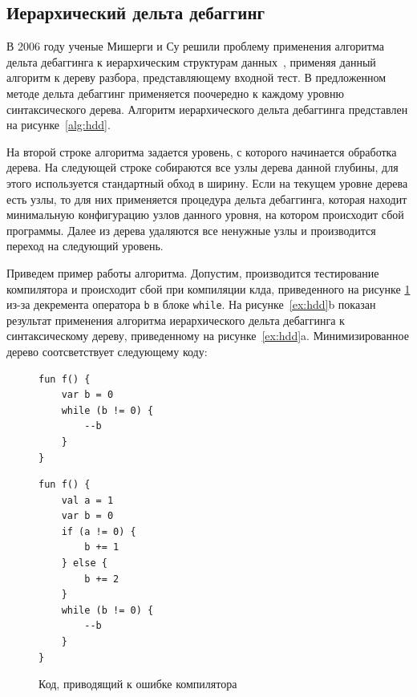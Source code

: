 \subsection{Иерархический дельта дебаггинг}
В 2006 году ученые Мишерги и Су решили проблему применения алгоритма дельта дебаггинга к иерархическим структурам данных~\cite{misherghi2006hdd}, применяя данный алгоритм к дереву разбора, представляющему входной тест. В предложенном методе дельта дебаггинг применяется поочередно к каждому уровню синтаксического дерева. Алгоритм иерархического дельта дебаггинга представлен на рисунке~\ref{alg:hdd}. 

На второй строке алгоритма задается уровень, с которого начинается обработка дерева. На следующей строке собираются все узлы дерева данной глубины, для этого используется стандартный обход в ширину. Если на текущем уровне дерева есть узлы, то для них применяется процедура дельта дебаггинга, которая находит минимальную конфигурацию узлов данного уровня, на котором происходит сбой программы. Далее из дерева удаляются все ненужные узлы и производится переход на следующий уровень. 

Приведем пример работы алгоритма. Допустим, производится тестирование компилятора и происходит сбой при компиляции клда, приведенного на рисунке \ref{ex1:hdd} из-за декремента оператора \texttt{b} в блоке \texttt{while}. На рисунке~\ref{ex:hdd}b показан результат применения алгоритма иерархического дельта дебаггинга к синтаксическому дереву, приведенному на рисунке~\ref{ex:hdd}a. Минимизированное дерево соотсветствует следующему коду:
\begin{figure}
\begin{lstlisting}
fun f() {
    var b = 0
    while (b != 0) {
        --b
    }
}
\end{lstlisting}
\end{figure}


\begin{figure}
\begin{lstlisting}
fun f() {
    val a = 1
    var b = 0
    if (a != 0) {
        b += 1
    } else {
        b += 2
    }
    while (b != 0) {
        --b
    }
}
\end{lstlisting}
\caption{\label{ex1:hdd}Код, приводящий к ошибке компилятора}
\end{figure}


